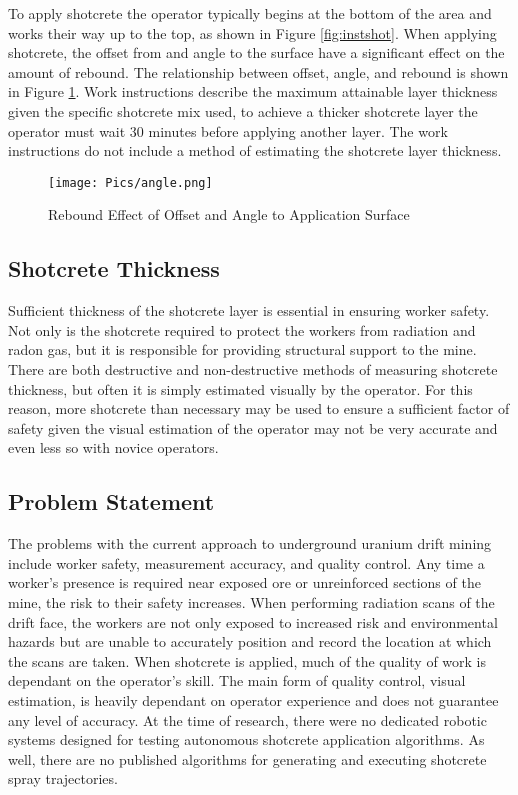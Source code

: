 To apply shotcrete the operator typically begins at the bottom of the area and works their way up to the top, as shown in Figure \ref{fig:instshot}. When applying shotcrete, the offset from and angle to the surface have a significant effect on the amount of rebound. The relationship between offset, angle, and rebound is shown in Figure \ref{fig:rebound}. Work instructions describe the maximum attainable layer thickness given the specific shotcrete mix used, to achieve a thicker shotcrete layer the operator must wait 30 minutes before applying another layer. The work instructions do not include a method of estimating the shotcrete layer thickness.\\

\begin{figure}
    \centering
    \texttt{[image: Pics/angle.png]}
    \caption{Rebound Effect of Offset and Angle to Application Surface \cite{camedoc}}
    \label{fig:rebound}
\end{figure}

\subsection{Shotcrete Thickness}

Sufficient thickness of the shotcrete layer is essential in ensuring worker safety. Not only is the shotcrete required to protect the workers from radiation and radon gas, but it is responsible for providing structural support to the mine. There are both destructive and non-destructive methods of measuring shotcrete thickness, but often it is simply estimated visually by the operator. For this reason, more shotcrete than necessary may be used to ensure a sufficient factor of safety given the visual estimation of the operator may not be very accurate and even less so with novice operators.\\

\subsection{Problem Statement}

The problems with the current approach to underground uranium drift mining include worker safety, measurement accuracy, and quality control. Any time a worker's presence is required near exposed ore or unreinforced sections of the mine, the risk to their safety increases. When performing radiation scans of the drift face, the workers are not only exposed to increased risk and environmental hazards but are unable to accurately position and record the location at which the scans are taken. When shotcrete is applied, much of the quality of work is dependant on the operator's skill. The main form of quality control, visual estimation, is heavily dependant on operator experience and does not guarantee any level of accuracy. At the time of research, there were no dedicated robotic systems designed for testing autonomous shotcrete application algorithms. As well, there are no published algorithms for generating and executing shotcrete spray trajectories.\\

